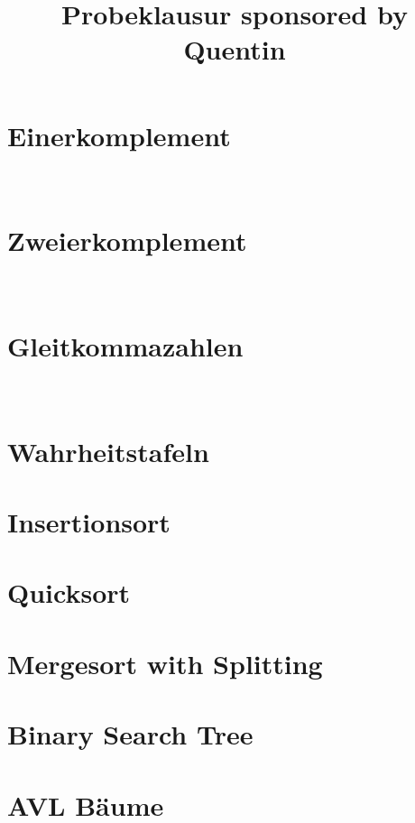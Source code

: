 \documentclass{article}
\title{Probeklausur sponsored by Quentin}
\begin{document}
\maketitle
\section{Einerkomplement}

\\


\section{Zweierkomplement}

\\


\section{Gleitkommazahlen}

\\


\section{Wahrheitstafeln}


\pagebreak
\section{Insertionsort}


\section{Quicksort}

\pagebreak
\section{Mergesort with Splitting}

\pagebreak
\section{Binary Search Tree}

\section{AVL Bäume}

\pagebreak
\end{document}
